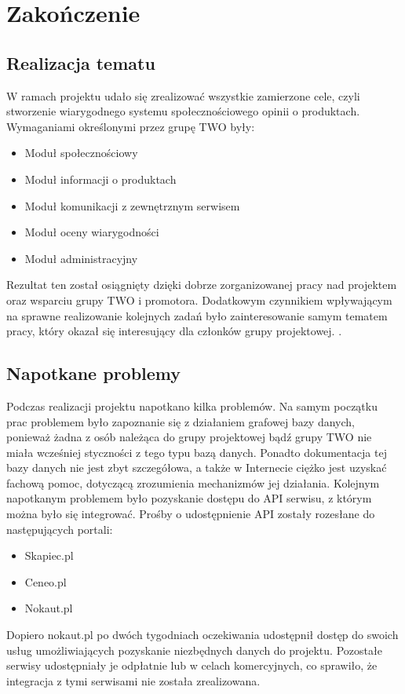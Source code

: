 \chapter{Zakończenie}

\section{Realizacja tematu}

W ramach projektu udało się zrealizować wszystkie zamierzone cele, czyli stworzenie wiarygodnego systemu społecznościowego opinii o produktach. Wymaganiami określonymi przez grupę TWO były:
\begin{itemize}
\item Moduł społecznościowy
\item Moduł informacji o produktach
\item Moduł komunikacji z zewnętrznym serwisem
\item Moduł oceny wiarygodności
\item Moduł administracyjny
\end{itemize}
Rezultat ten został osiągnięty dzięki dobrze zorganizowanej pracy nad projektem oraz wsparciu grupy TWO i promotora. Dodatkowym czynnikiem wpływającym na sprawne realizowanie kolejnych zadań było zainteresowanie samym tematem pracy, który okazał się interesujący dla członków grupy projektowej. .

\section{Napotkane problemy}

Podczas realizacji projektu napotkano kilka problemów. Na samym początku prac problemem było zapoznanie się z działaniem grafowej bazy danych, ponieważ żadna z osób należąca do grupy projektowej bądź grupy TWO nie miała wcześniej styczności z tego typu bazą danych. Ponadto dokumentacja tej bazy danych nie jest zbyt szczegółowa, a także w Internecie ciężko jest uzyskać fachową pomoc, dotyczącą zrozumienia mechanizmów jej działania.
Kolejnym napotkanym problemem było pozyskanie dostępu do API serwisu, z którym można było się integrować. Prośby o udostępnienie API zostały rozesłane do następujących portali:
\begin{itemize}
\item Skapiec.pl
\item Ceneo.pl
\item Nokaut.pl
\end{itemize}
Dopiero nokaut.pl po dwóch tygodniach oczekiwania udostępnił dostęp do swoich usług umożliwiających pozyskanie niezbędnych danych do projektu. Pozostałe serwisy udostępniały je odpłatnie lub w celach komercyjnych, co sprawiło, że integracja z tymi serwisami nie została zrealizowana.


